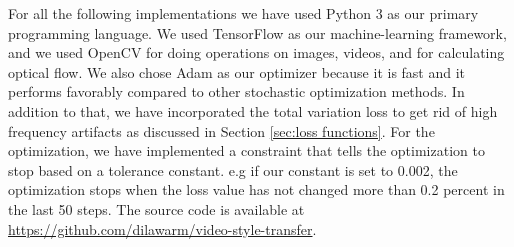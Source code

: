For all the following implementations we have used Python 3 as our primary programming language. We used TensorFlow as our machine-learning framework, and we used OpenCV for doing operations on images, videos, and for calculating optical flow. We also chose Adam as our optimizer because it is fast and it performs favorably compared to other stochastic optimization methods. In addition to that, we have incorporated the total variation loss to get rid of high frequency artifacts as discussed in Section \ref{sec:loss functions}. \newline\newline For the optimization, we have implemented a constraint that tells the optimization to stop based on a tolerance constant. e.g if our constant is set to 0.002, the optimization stops when the loss value has not changed more than 0.2 percent in the last 50 steps. The source code is available at \url{https://github.com/dilawarm/video-style-transfer}.